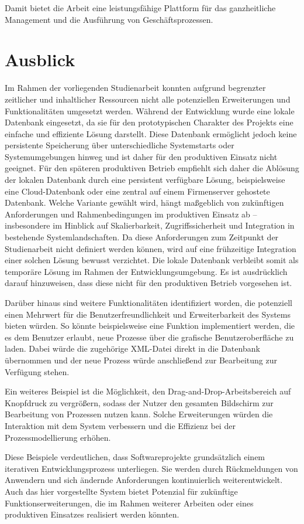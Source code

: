 Damit bietet die Arbeit eine leistungsfähige Plattform für das ganzheitliche Management und die Ausführung von Geschäftsprozessen.


\newpage
\section*{Ausblick}
Im Rahmen der vorliegenden Studienarbeit konnten aufgrund begrenzter zeitlicher und inhaltlicher Ressourcen nicht alle potenziellen Erweiterungen und Funktionalitäten umgesetzt werden. Während der Entwicklung wurde eine lokale Datenbank eingesetzt, da sie für den prototypischen Charakter des Projekts eine einfache und effiziente Lösung darstellt. Diese Datenbank ermöglicht jedoch keine persistente Speicherung über unterschiedliche Systemstarts oder Systemumgebungen hinweg und ist daher für den produktiven Einsatz nicht geeignet.
Für den späteren produktiven Betrieb empfiehlt sich daher die Ablösung der lokalen Datenbank durch eine persistent verfügbare Lösung, beispielsweise eine Cloud-Datenbank oder eine zentral auf einem Firmenserver gehostete Datenbank. Welche Variante gewählt wird, hängt maßgeblich von zukünftigen Anforderungen und Rahmenbedingungen im produktiven Einsatz ab – insbesondere im Hinblick auf Skalierbarkeit, Zugriffssicherheit und Integration in bestehende Systemlandschaften. Da diese Anforderungen zum Zeitpunkt der Studienarbeit nicht definiert werden können, wird auf eine frühzeitige Integration einer solchen Lösung bewusst verzichtet. Die lokale Datenbank verbleibt somit als temporäre Lösung im Rahmen der Entwicklungsumgebung. Es ist ausdrücklich darauf hinzuweisen, dass diese nicht für den produktiven Betrieb vorgesehen ist.

Darüber hinaus sind weitere Funktionalitäten identifiziert worden, die potenziell einen Mehrwert für die Benutzerfreundlichkeit und Erweiterbarkeit des Systems bieten würden. So könnte beispielsweise eine Funktion implementiert werden, die es dem Benutzer erlaubt, neue Prozesse über die grafische Benutzeroberfläche zu laden. Dabei würde die zugehörige XML-Datei direkt in die Datenbank übernommen und der neue Prozess würde anschließend zur Bearbeitung zur Verfügung stehen.

Ein weiteres Beispiel ist die Möglichkeit, den Drag-and-Drop-Arbeitsbereich auf Knopfdruck zu vergrößern, sodass der Nutzer den gesamten Bildschirm zur Bearbeitung von Prozessen nutzen kann. Solche Erweiterungen würden die Interaktion mit dem System verbessern und die Effizienz bei der Prozessmodellierung erhöhen.

Diese Beispiele verdeutlichen, dass Softwareprojekte grundsätzlich einem iterativen Entwicklungsprozess unterliegen. Sie werden durch Rückmeldungen von Anwendern und sich ändernde Anforderungen kontinuierlich weiterentwickelt. Auch das hier vorgestellte System bietet Potenzial für zukünftige Funktionserweiterungen, die im Rahmen weiterer Arbeiten oder eines produktiven Einsatzes realisiert werden könnten.



